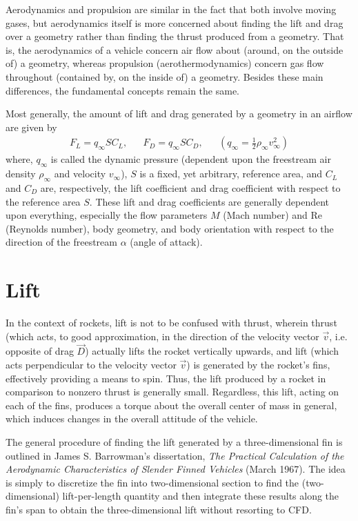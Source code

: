 \documentclass[11pt,dvipsnames]{thesis}
\begin{document}
Aerodynamics and propulsion are similar in the fact that both involve moving gases, but aerodynamics itself is more concerned about finding the lift and drag over a geometry rather than finding the thrust produced from a geometry. That is, the aerodynamics of a vehicle concern air flow about (around, on the outside of) a geometry, whereas propulsion (aerothermodynamics) concern gas flow throughout (contained by, on the inside of) a geometry. Besides these main differences, the fundamental concepts remain the same.

Most generally, the amount of lift and drag generated by a geometry in an airflow are given by
\begin{align}
F_L = q_\infty S C_L, && F_D = q_\infty S C_D, && \left(q_\infty = \frac{1}{2}\rho_\infty v_\infty^2\right)
\end{align}
where, $q_\infty$ is called the dynamic pressure (dependent upon the freestream air density $\rho_\infty$ and velocity $v_\infty$), $S$ is a fixed, yet arbitrary, reference area, and $C_L$ and $C_D$ are, respectively, the lift coefficient and drag coefficient with respect to the reference area $S$. These lift and drag coefficients are generally dependent upon everything, especially the flow parameters $M$ (Mach number) and $\mathrm{Re}$ (Reynolds number), body geometry, and body orientation with respect to the direction of the freestream $\alpha$ (angle of attack).

\section{Lift}
In the context of rockets, lift is not to be confused with thrust, wherein thrust (which acts, to good approximation, in the direction of the velocity vector $\vec{v}$, i.e. opposite of drag $\vec{D}$) actually lifts the rocket vertically upwards, and lift (which acts perpendicular to the velocity vector $\vec{v}$) is generated by the rocket's fins, effectively providing a means to spin. Thus, the lift produced by a rocket in comparison to nonzero thrust is generally small.
Regardless, this lift, acting on each of the fins, produces a torque about the overall center of mass in general, which induces changes in the overall attitude of the vehicle.

The general procedure of finding the lift generated by a three-dimensional fin is outlined in James S. Barrowman's dissertation, \textit{The Practical Calculation of the Aerodynamic Characteristics of Slender Finned Vehicles} (March 1967). The idea is simply to discretize the fin into two-dimensional section to find the (two-dimensional) lift-per-length quantity and then integrate these results along the fin's span to obtain the three-dimensional lift without resorting to CFD.
\end{document}
